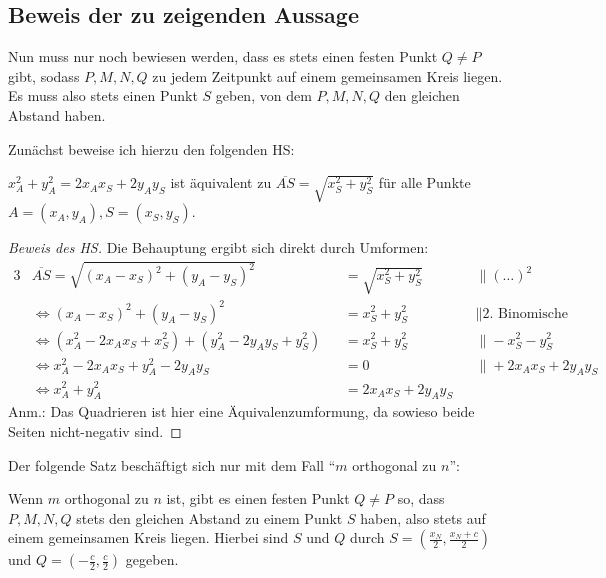 \subsection*{Beweis der zu zeigenden Aussage}

Nun muss nur noch bewiesen werden, dass es stets einen festen Punkt $Q\neq P$ gibt, sodass $P, M, N, Q$ zu jedem 
Zeitpunkt auf einem gemeinsamen Kreis liegen. Es muss also stets einen Punkt $S$ geben, von dem $P, M, N, Q$ den 
gleichen Abstand haben.

Zunächst beweise ich hierzu den folgenden HS:
\begin{lem}\label{cor_hilfe}
    $x_A^2+y_A^2=2x_Ax_S+2y_Ay_S$ ist äquivalent zu $\overline{AS}=\sqrt{x_S^2+y_S^2}$ für alle 
    Punkte $A=(x_A, y_A), S=(x_S, y_S)$.
\end{lem}
\begin{proof}[Beweis des HS]
    \renewcommand{\qedsymbol}{$\square$}
    Die Behauptung ergibt sich direkt durch Umformen:
    \begin{alignat*}{3}
        &\overline{AS}=\sqrt{(x_A-x_S)^2+(y_A-y_S)^2}&&=\sqrt{x_S^2+y_S^2}\quad&&\|(\ldots)^2\\
        &\Leftrightarrow (x_A-x_S)^2+(y_A-y_S)^2&&=x_S^2+y_S^2\quad &&\|\text{2. Binomische Formel}\\
        &\Leftrightarrow (x_A^2-2x_Ax_S+x_S^2)+(y_A^2-2y_Ay_S+y_S^2)&&=x_S^2+y_S^2\quad &&\|-x_S^2-y_S^2\\
        &\Leftrightarrow x_A^2-2x_Ax_S+y_A^2-2y_Ay_S&&=0\quad &&\|+2x_Ax_S+2y_Ay_S\\
        &\Leftrightarrow x_A^2+y_A^2&&=2x_Ax_S+2y_Ay_S&&
    \end{alignat*}
    Anm.: Das Quadrieren ist hier eine Äquivalenzumformung, da sowieso beide Seiten nicht-negativ sind.
\end{proof}
Der folgende Satz beschäftigt sich nur mit dem Fall "`$m$ orthogonal zu $n$"':
\begin{thm}\label{aufgabe_3}
    Wenn $m$ orthogonal zu $n$ ist, gibt es einen festen Punkt $Q\neq P$ so, dass $P, M, N, Q$ stets 
    den gleichen Abstand zu einem Punkt $S$ haben, also stets auf einem gemeinsamen Kreis liegen. 
    Hierbei sind $S$ und $Q$ durch $S=\left(\frac{x_N}{2}, \frac{x_N+c}{2}\right)$ und $Q=\left(-\frac{c}{2}, 
    \frac{c}{2}\right)$ gegeben.
\end{thm}
